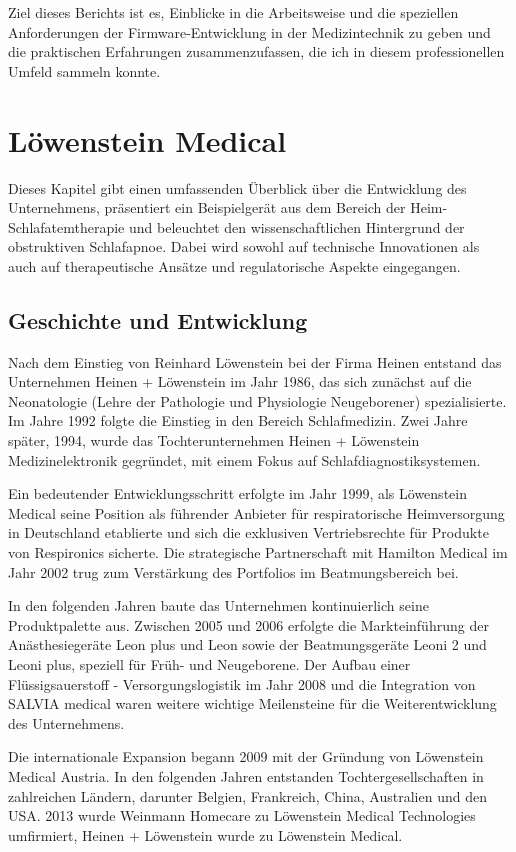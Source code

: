 \documentclass[a4paper, 12pt]{article}
\begin{document}
Ziel dieses Berichts ist es, Einblicke in die Arbeitsweise und die speziellen Anforderungen der Firmware-Entwicklung in der Medizintechnik zu geben und die praktischen Erfahrungen zusammenzufassen, die ich in diesem professionellen Umfeld sammeln konnte. 

\newpage
\section{Löwenstein Medical}\label{loewenstein}
Dieses Kapitel gibt einen umfassenden Überblick über die Entwicklung des Unternehmens, präsentiert ein Beispielgerät aus dem Bereich der Heim-Schlafatemtherapie und beleuchtet den wissenschaftlichen Hintergrund der obstruktiven Schlafapnoe. Dabei wird sowohl auf technische Innovationen als auch auf therapeutische Ansätze und regulatorische Aspekte eingegangen.

\subsection{Geschichte und Entwicklung}
Nach dem Einstieg von Reinhard Löwenstein bei der Firma Heinen entstand das Unternehmen Heinen + Löwenstein im Jahr 1986, das sich zunächst auf die Neonatologie (Lehre der Pathologie und Physiologie Neugeborener) spezialisierte. Im Jahre 1992 folgte die Einstieg in den Bereich Schlafmedizin. Zwei Jahre später, 1994, wurde das Tochterunternehmen Heinen + Löwenstein Medizinelektronik gegründet, mit einem Fokus auf Schlafdiagnostiksystemen.

Ein bedeutender Entwicklungsschritt erfolgte im Jahr 1999, als Löwenstein Medical seine Position als führender Anbieter für respiratorische Heimversorgung in Deutschland etablierte und sich die exklusiven Vertriebsrechte für Produkte von Respironics sicherte. Die strategische Partnerschaft mit Hamilton Medical im Jahr 2002 trug zum Verstärkung des Portfolios im Beatmungsbereich bei.

In den folgenden Jahren baute das Unternehmen kontinuierlich seine Produktpalette aus. Zwischen 2005 und 2006 erfolgte die Markteinführung der Anästhesiegeräte Leon plus und Leon sowie der Beatmungsgeräte Leoni 2 und Leoni plus, speziell für Früh- und Neugeborene. Der Aufbau einer Flüssigsauerstoff - Versorgungslogistik im Jahr 2008 und die Integration von SALVIA medical waren weitere wichtige Meilensteine für die Weiterentwicklung des Unternehmens.

Die internationale Expansion begann 2009 mit der Gründung von Löwenstein Medical Austria. In den folgenden Jahren entstanden Tochtergesellschaften in zahlreichen Ländern, darunter Belgien, Frankreich, China, Australien und den USA. 2013 wurde Weinmann Homecare zu Löwenstein Medical Technologies umfirmiert, Heinen + Löwenstein wurde zu Löwenstein Medical.
\end{document}
